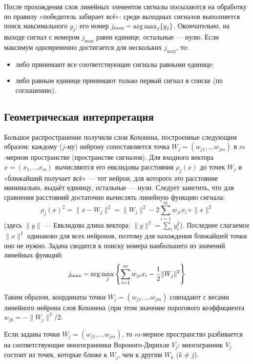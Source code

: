 \documentclass[a4paper,12pt]{article}
\begin{document}
После прохождения слоя линейных элементов сигналы посылаются на обработку по правилу «победитель забирает всё»: среди выходных сигналов выполняется поиск максимального \(y_{j}\); его номер \(j_{{\max }}={{\rm {arg}}}\max _{{j}}\{y_{j}\}\). Окончательно, на выходе сигнал с номером \(j_{{\max }}\) равен единице, остальные — нулю. Если максимум одновременно достигается для нескольких \(j_{{\max }}\), то:
\begin{itemize}
  \setlength\itemsep{0em}
  \item либо принимают все соответствующие сигналы равными единице;
  \item либо равным единице принимают только первый сигнал в списке (по соглашению).
\end{itemize}

\subsection{Геометрическая интерпретация}

Большое распространение получили слои Кохонена, построенные следующим образом: каждому ($j$-му) нейрону сопоставляется точка $W_{j}=(w_{{j1}},...w_{{jm}})$ в $m$-мерном пространстве (пространстве сигналов). Для входного вектора $x=(x_{1},...x_{m})$ вычисляются его евклидовы расстояния $\rho _{j}(x)$ до точек $W_j$ и «ближайший получает всё» — тот нейрон, для которого это расстояние минимально, выдаёт единицу, остальные — нули. Следует заметить, что для сравнения расстояний достаточно вычислять линейную функцию сигнала:
\[
  \rho _{j}(x)^{2}=\|x-W_{j}\|^{2}=\|W_{j}\|^{2}-2\sum _{{i=1}}^{m}w_{{ji}}x_{i}+\|x\|^{2}
\]
(здесь $\|y\|$ — Евклидова длина вектора: $\|y\|^{2}=\sum _{i}y_{i}^{2}$). Последнее слагаемое $\|x\|^{2}$ одинаково для всех нейронов, поэтому для нахождения ближайшей точки оно не нужно. Задача сводится к поиску номера наибольшего из значений линейных функций:
\[
  j_{\max }={\rm {arg}}\max _{j}\left\{\sum _{i=1}^{m}w_{ji}x_{i}-{\frac {1}{2}}\|W_{j}\|^{2}\right\}
\]

Таким образом, координаты точки ${\displaystyle W_{j}=(w_{j1},...w_{jm})}$ совпадают с весами линейного нейрона слоя Кохонена (при этом значение порогового коэффициента ${\displaystyle w_{j0}=-\|W_{j}\|^{2}/2}$.

Если заданы точки $W_{j}=(w_{{j1}},...w_{{jm}})$, то $m$-мерное пространство разбивается на соответствующие многогранники Вороного-Дирихле $V_{j}$: многогранник $V_{j}$ состоит из точек, которые ближе к $W_j$, чем к другим $W_{k}$ ($k\neq j$).
\cite{wikipedia_network}
\end{document}
